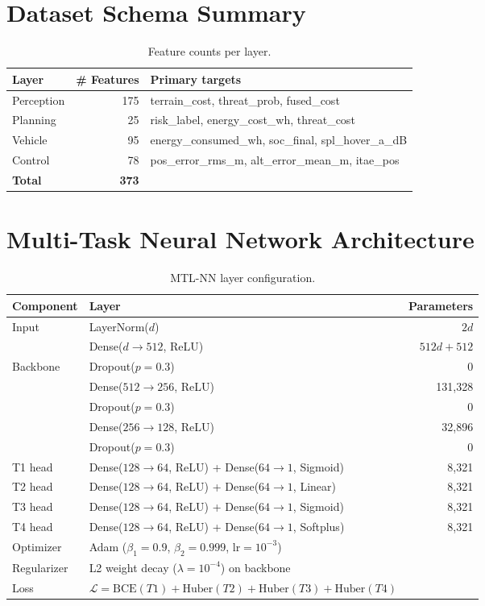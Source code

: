 ﻿\documentclass{article}
\begin{document}
\section{Dataset Schema Summary}
\label{app:schema}

\begin{table}[h]
\centering
\caption{Feature counts per layer.}
\begin{tabular}{lrl}
\toprule
Layer & \# Features & Primary targets \\
\midrule
Perception   & 175 & terrain\_cost, threat\_prob, fused\_cost \\
Planning     &  25 & risk\_label, energy\_cost\_wh, threat\_cost \\
Vehicle      &  95 & energy\_consumed\_wh, soc\_final, spl\_hover\_a\_dB \\
Control      &  78 & pos\_error\_rms\_m, alt\_error\_mean\_m, itae\_pos \\
\midrule
\textbf{Total} & \textbf{373} & \\
\bottomrule
\end{tabular}
\end{table}

\section{Multi-Task Neural Network Architecture}
\label{app:nn_arch}

\begin{table}[h]
\centering
\caption{MTL-NN layer configuration.}
\begin{tabular}{llr}
\toprule
Component & Layer & Parameters \\
\midrule
Input       & LayerNorm($d$)              & $2d$ \\
            & Dense($d \to 512$, ReLU)   & $512d + 512$ \\
Backbone    & Dropout($p=0.3$)           & 0 \\
            & Dense($512 \to 256$, ReLU) & 131{,}328 \\
            & Dropout($p=0.3$)           & 0 \\
            & Dense($256 \to 128$, ReLU) & 32{,}896 \\
            & Dropout($p=0.3$)           & 0 \\
\midrule
T1 head & Dense($128 \to 64$, ReLU) + Dense($64 \to 1$, Sigmoid) & 8{,}321 \\
T2 head & Dense($128 \to 64$, ReLU) + Dense($64 \to 1$, Linear)  & 8{,}321 \\
T3 head & Dense($128 \to 64$, ReLU) + Dense($64 \to 1$, Sigmoid) & 8{,}321 \\
T4 head & Dense($128 \to 64$, ReLU) + Dense($64 \to 1$, Softplus)& 8{,}321 \\
\midrule
Optimizer & Adam ($\beta_1{=}0.9$, $\beta_2{=}0.999$, lr$=10^{-3}$) & \\
Regularizer & L2 weight decay ($\lambda{=}10^{-4}$) on backbone & \\
Loss & $\mathcal{L} = \text{BCE}(T1) + \text{Huber}(T2) + \text{Huber}(T3) + \text{Huber}(T4)$ & \\
\bottomrule
\end{tabular}
\end{table}
\end{document}
